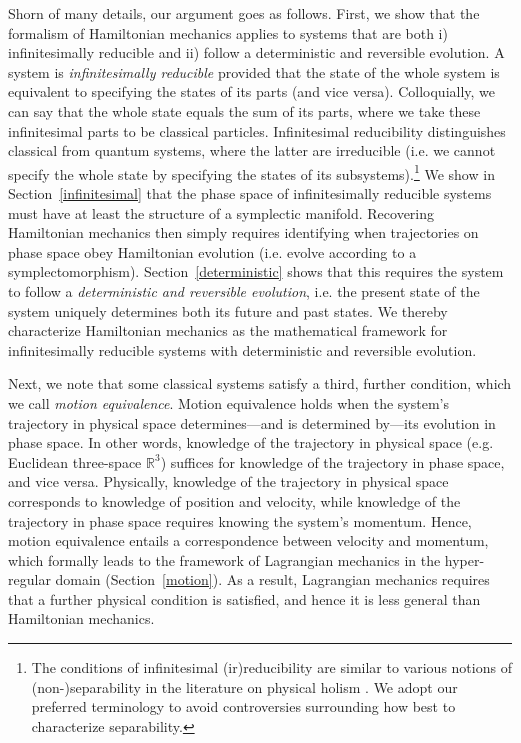 \documentclass[12pt, twoside]{article}
\begin{document}
Shorn of many details, our argument goes as follows. First, we show that the formalism of Hamiltonian mechanics applies to systems that are both i) infinitesimally reducible and ii) follow a deterministic and reversible evolution. A system is \textit{infinitesimally reducible} provided that the state of the whole system is equivalent to specifying the states of its parts (and vice versa). Colloquially, we can say that the whole state equals the sum of its parts, where we take these infinitesimal parts to be classical particles. Infinitesimal reducibility distinguishes classical from quantum systems, where the latter are irreducible (i.e. we cannot specify the whole state by specifying the states of its subsystems).\footnote{The conditions of infinitesimal (ir)reducibility are similar to various notions of (non-)separability in the literature on physical holism \parencites[46, 124]{Healey}. We adopt our preferred terminology to avoid controversies surrounding how best to characterize separability.} We show in Section~\ref{infinitesimal} that the phase space of infinitesimally reducible systems must have at least the structure of a symplectic manifold. Recovering Hamiltonian mechanics then simply requires identifying when trajectories on phase space obey Hamiltonian evolution  (i.e. evolve according to a symplectomorphism). Section~\ref{deterministic} shows that this requires the system to follow a \textit{deterministic and reversible evolution}, i.e. the present state of the system uniquely determines both its future and past states. We thereby characterize Hamiltonian mechanics as the mathematical framework for infinitesimally reducible systems with deterministic and reversible evolution.  

Next, we note that some classical systems satisfy a third, further condition, which we call \textit{motion equivalence}. Motion equivalence holds when the system's trajectory in physical space determines---and is determined by---its evolution in phase space. In other words, knowledge of the trajectory in physical space (e.g. Euclidean three-space $\mathbb{R}^3$) suffices for knowledge of the trajectory in phase space, and vice versa. Physically, knowledge of the trajectory in physical space corresponds to knowledge of position and velocity, while knowledge of the trajectory in phase space requires knowing the system's momentum. Hence, motion equivalence entails a correspondence between velocity and momentum, which formally leads to the framework of Lagrangian mechanics in the hyper-regular domain (Section~\ref{motion}). As a result, Lagrangian mechanics requires that a further physical condition is satisfied, and hence it is less general than Hamiltonian mechanics. 
\end{document}
